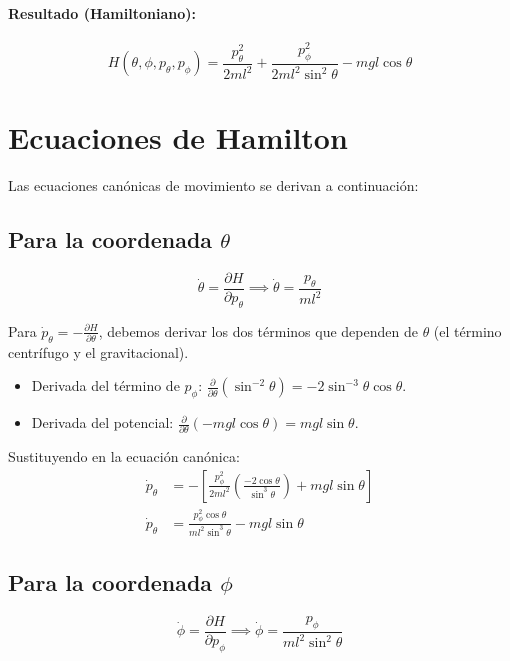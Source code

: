 \documentclass[12pt, a4paper]{article}
\begin{document}
\paragraph{Resultado (Hamiltoniano):}
\begin{equation}
    H(\theta, \phi, p_\theta, p_\phi) = \frac{p_\theta^2}{2 m l^2} + \frac{p_\phi^2}{2 m l^2 \sin^2\theta} - mgl \cos\theta
\end{equation}

\section*{Ecuaciones de Hamilton}

Las ecuaciones canónicas de movimiento se derivan a continuación:

\subsection*{Para la coordenada $\theta$}
\begin{equation}
    \dot{\theta} = \frac{\partial H}{\partial p_\theta} \implies \dot{\theta} = \frac{p_\theta}{m l^2}
\end{equation}

Para $\dot{p}_\theta = -\frac{\partial H}{\partial \theta}$, debemos derivar los dos términos que dependen de $\theta$ (el término centrífugo y el gravitacional).
\begin{itemize}
    \item Derivada del término de $p_\phi$: $\frac{\partial}{\partial \theta}(\sin^{-2}\theta) = -2\sin^{-3}\theta \cos\theta$.
    \item Derivada del potencial: $\frac{\partial}{\partial \theta}(-mgl \cos\theta) = mgl \sin\theta$.
\end{itemize}

Sustituyendo en la ecuación canónica:
\begin{align}
    \dot{p}_\theta &= - \left[ \frac{p_\phi^2}{2 m l^2} \left( \frac{-2 \cos\theta}{\sin^3\theta} \right) + mgl \sin\theta \right] \nonumber \\
    \dot{p}_\theta &= \frac{p_\phi^2 \cos\theta}{m l^2 \sin^3\theta} - mgl \sin\theta
\end{align}

\subsection*{Para la coordenada $\phi$}
\begin{equation}
    \dot{\phi} = \frac{\partial H}{\partial p_\phi} \implies \dot{\phi} = \frac{p_\phi}{m l^2 \sin^2\theta}
\end{equation}
\end{document}
